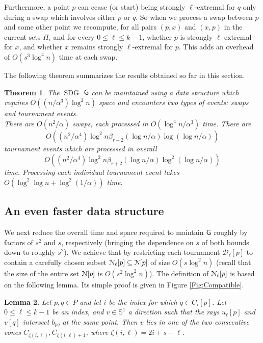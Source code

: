 \documentclass[letter,11pt]{article}
\newtheorem{theorem}{Theorem}[section]
\newtheorem{lemma}[theorem]{Lemma}
\def\NN{\EuScript{N}}
\def\dirtour{{\mathcal D}}
\def\bisect{b}
\def\G{{\sf G}}
\def\SDG{\mathop{\mathrm{SDG}}}
\begin{document}
Furthermore, a point $p$ can cease (or start) being  strongly
$\ell$-extremal for $q$ only during a swap which involves either $p$ or $q$. 
So when we process a swap 
between $p$ and some other point we
recompute, for all pairs $(p,x)$ and $(x,p)$ in the current 
sets $\Pi_{i}$ and for every
$0\le \ell \le k-1$,
 whether $p$ is  strongly $\ell$-extremal for $x$, and whether $x$ remains  strongly $\ell$-extremal for $p$.
This adds an overhead of
$O(s^3\log^4n)$ time at each
swap. 

The following theorem summarizes the results obtained so far in this section.

\begin{theorem}
The $\SDG$ $\G$ can be maintained using a data structure which
requires 
$O\left(\left(n/\alpha^3\right) \log^2 n\right)$ space
 and encounters two types of
events: swaps and tournament events.\\ 
There are $O(n^2/\alpha)$ swaps, 
each processed in $O\left(\log^4n/\alpha^3\right)$ time. 
There are
$$
 O\left(\left(n^2/\alpha^4\right)\log^2n \beta_{r+2}(\log n/\alpha)\log(\log n/\alpha)\right)
$$  tournament 
events which are processed in overall
$$
O\left(\left(n^2/\alpha^4\right)\log^2 n\beta_{r+2}(\log n/\alpha)\log^2(\log n/\alpha)\right)
$$ 
time.
Processing each individual tournament event takes  $O(\log^2\log n+\log^2 (1/\alpha))$ time.
\end{theorem}


\subsection{An even faster data structure}\label{Subsec:ReducedMaintenImprove}

We next reduce the overall time and space required to maintain $\G$
roughly by factors of $s^2$ and $s$, respectively (bringing the dependence on $s$ of both bounds down to roughly $s^2$).  We achieve that by
restricting each tournament $\dirtour_\ell[p]$ to contain a carefully chosen
subset $\NN_\ell[p]\subseteq \NN[p]$ of size $O(s\log^2n)$ (recall that the size of the entire set $\NN[p]$ is $O(s^2\log^2n)$).
The definition of $\NN_\ell[p]$ is based on
the following lemma. Its simple proof is given in Figure \ref{Fig:Compatible}.

\begin{lemma}\label{Lemma:Compatible}
Let $p,q\in P$ and let $i$ be the index for which 
$q \in C_i[p]$. Let $0\leq \ell\leq k-1$ be an index, and $v\in \mathbb{S}^1$ a direction such that
the rays $u_\ell[p]$ and $v[q]$ intersect
$\bisect_{pq}$ at the same point. 
Then $v$ lies in one of the two consecutive cones $C_{\zeta(i,\ell)},C_{\zeta(i,\ell)+1}$, where $\zeta(i,\ell)=2i+s-\ell$.
\end{lemma}
\end{document}
